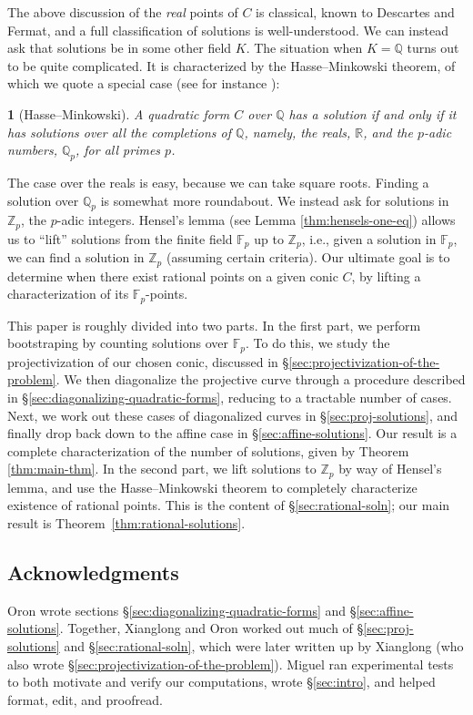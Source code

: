 \documentclass[10pt,a4paper]{amsart}
\numberwithin{equation}{section}
\numberwithin{figure}{section}
\numberwithin{table}{section}
\theoremstyle{definition}
\theoremstyle{plain}
\newtheorem{thm}{\protect\theoremname}[section]
\theoremstyle{remark}
\theoremstyle{plain}
\theoremstyle{definition}
\theoremstyle{plain}
\theoremstyle{plain}
\providecommand{\theoremname}{Theorem}
\newcommand{\F}{\mathbb{F}}
\newcommand{\Z}{\mathbb{Z}}
\newcommand{\Q}{\mathbb{Q}}
\newcommand{\R}{\mathbb{R}}
\begin{document}
	The above discussion of the \emph{real} points of $C$ is classical, known to 
	Descartes and Fermat, and a full classification of solutions is well-understood. 
	We can instead ask that solutions be in some other field $K$.
	The situation when $K=\Q$ turns out to be quite complicated. It is
	characterized by the Hasse--Minkowski theorem, of which we quote a special
	case (see for instance \cite[\S IV.3, Thm.~8]{serre}):
	\begin{thm}[Hasse--Minkowski]
		A quadratic form $C$ over $\Q$ has a solution if and only if it has solutions
		over all the completions of $\Q$, namely, the reals, $\R$, and the $p$-adic
		numbers, $\Q_p$, for all primes $p$.
	\end{thm}
	The case over the reals is easy, because we can take square roots. 
    Finding a solution over $\Q_p$ is somewhat more roundabout. We instead ask for solutions
	in $\Z_p$, the $p$-adic integers. Hensel's lemma
	(see Lemma \ref{thm:hensels-one-eq}) allows us to ``lift'' solutions from the finite
	field $\F_p$ up to $\Z_p$, i.e., given a solution in $\F_p$, we can find a solution
	in $\Z_p$ (assuming certain criteria). Our ultimate
	goal is to determine when there exist rational points on a given conic $C$, by lifting
	a characterization of its $\F_p$-points.
		
	This paper is roughly divided into two parts. In the first part, we perform
	bootstraping by counting solutions over $\F_p$. To do this,
	we study the projectivization of our chosen conic, discussed in
	\S\ref{sec:projectivization-of-the-problem}. We then diagonalize 
	the projective curve through a procedure described in 
	\S\ref{sec:diagonalizing-quadratic-forms}, reducing to a tractable number of cases. Next, we work out these cases
	of diagonalized curves in \S\ref{sec:proj-solutions}, and finally
	drop back down to the affine case in \S\ref{sec:affine-solutions}. Our result
	is a complete characterization of the number of solutions, given by 
	Theorem \ref{thm:main-thm}.
	In the second part, we lift solutions to $\Z_p$ by way of
	Hensel's lemma, and use the Hasse--Minkowski theorem
	to completely characterize existence of rational points. This is the content of \S\ref{sec:rational-soln}; our main result is Theorem~\ref{thm:rational-solutions}.
	
	\subsection*{Acknowledgments} Oron wrote sections \S\ref{sec:diagonalizing-quadratic-forms} and \S\ref{sec:affine-solutions}. Together, Xianglong and Oron worked out much of \S\ref{sec:proj-solutions} and \S\ref{sec:rational-soln}, which were later written up by Xianglong (who also wrote \S\ref{sec:projectivization-of-the-problem}). Miguel ran experimental tests to both motivate and verify our computations, wrote \S\ref{sec:intro}, and helped format, edit, and proofread.
	
\end{document}
